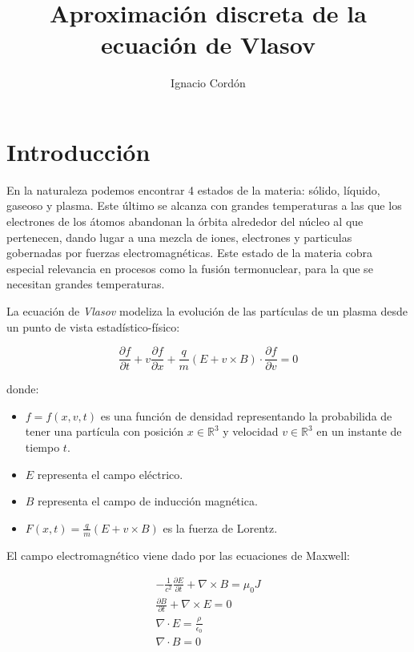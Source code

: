 \documentclass[a4paper,10pt]{scrartcl}
\title{Aproximación discreta de la ecuación de Vlasov}
\author{
	Ignacio Cordón
}
\date{}
\theoremstyle{definition}
\numberwithin{equation}{section}
\begin{document}
\maketitle
\begin{center}
\end{center}
\tableofcontents
\pagebreak

\section{Introducción}
En la naturaleza podemos encontrar 4 estados de la materia: sólido, líquido, gaseoso y plasma. Este último se alcanza con grandes temperaturas a las que los electrones de los átomos abandonan la órbita alrededor del núcleo al que pertenecen, dando lugar a una mezcla de iones, electrones y particulas gobernadas por fuerzas electromagnéticas. Este estado de la materia cobra especial relevancia en procesos como la fusión termonuclear, para la que se necesitan grandes temperaturas.  

La ecuación de \textit{Vlasov} modeliza la evolución de las partículas de un plasma desde un punto de vista estadístico-físico:

\begin{equation}
 \frac{\partial f}{\partial t} + v \frac{\partial f}{\partial x} + \frac{q}{m} (E + v\times B) \cdot \frac{\partial f}{\partial v} = 0
\end{equation}

donde:

\begin{itemize}
 \item $f = f(x,v,t)$ es una función de densidad representando la probabilida de tener una partícula con posición $x \in \mathbb{R}^3$ y velocidad $v \in \mathbb{R}^3$ en un instante de tiempo $t$.
 \item $E$ representa el campo eléctrico.
 \item $B$ representa el campo de inducción magnética.
 \item $F(x,t) = \frac{q}{m}(E + v\times B)$ es la fuerza de Lorentz.
\end{itemize}

El campo electromagnético viene dado por las ecuaciones de Maxwell:

\begin{align*}
 -\frac{1}{c^2} \frac{\partial E}{\partial t} + \nabla \times B = \mu_0 J\\
 \frac{\partial B}{\partial t} + \nabla \times E = 0\\
 \nabla \cdot E = \frac{\rho}{\epsilon_0}\\
 \nabla \cdot B = 0
\end{align*}
\end{document}
